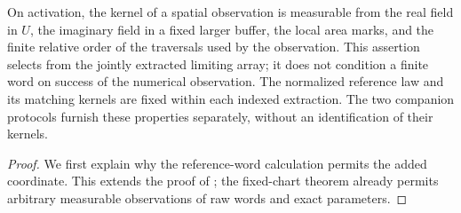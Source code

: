 \begin{proposition}
On activation, the kernel of a spatial observation is measurable from
the real field in \(U\), the imaginary field in a fixed larger buffer,
the local area marks, and the finite relative order of the traversals
used by the observation.  This assertion selects from the jointly
extracted limiting array; it does not condition a finite word on success
of the numerical observation.  The normalized reference law and its
matching kernels are fixed within each indexed extraction.  The two
companion protocols furnish these properties separately, without an
identification of their kernels.
\end{proposition}

\begin{proof}
We first explain why the reference-word calculation permits the added
coordinate.  This extends the proof of
\cite[Lemma~5.8 and Theorem~5.9]{C}; the fixed-chart theorem
\cite[Theorem~7.10]{P} already permits arbitrary measurable
observations of raw words and exact parameters.


\end{proof}
